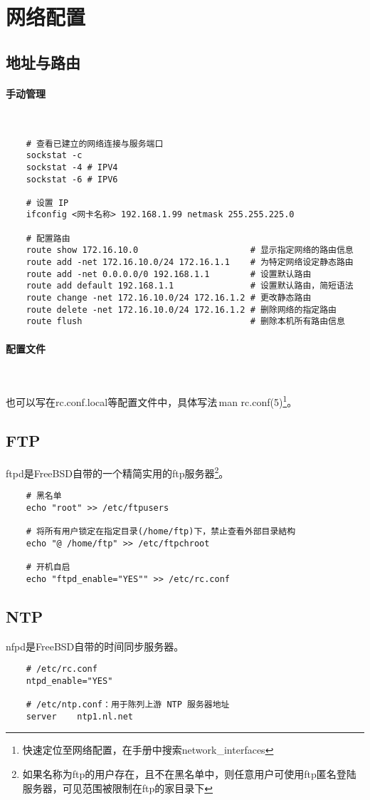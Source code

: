 \section{网络配置}

\subsection{地址与路由}

\paragraph{手动管理}~

\begin{lstlisting}
    # 查看已建立的网络连接与服务端口
    sockstat -c
    sockstat -4 # IPV4
    sockstat -6 # IPV6

    # 设置 IP
    ifconfig <网卡名称> 192.168.1.99 netmask 255.255.225.0

    # 配置路由
	route show 172.16.10.0                      # 显示指定网络的路由信息
	route add -net 172.16.10.0/24 172.16.1.1    # 为特定网络设定静态路由
	route add -net 0.0.0.0/0 192.168.1.1        # 设置默认路由
	route add default 192.168.1.1               # 设置默认路由，简短语法
	route change -net 172.16.10.0/24 172.16.1.2 # 更改静态路由
	route delete -net 172.16.10.0/24 172.16.1.2 # 删除网络的指定路由
	route flush                                 # 删除本机所有路由信息
\end{lstlisting}

\paragraph{配置文件}~

也可以写在rc.conf.local等配置文件中，具体写法\,man rc.conf(5)\footnote{快速定位至网络配置，在手册中搜索network\_interfaces}。

\subsection{FTP}
ftpd是FreeBSD自带的一个精简实用的ftp服务器\footnote{如果名称为ftp的用户存在，且不在黑名单中，则任意用户可使用ftp匿名登陆服务器，可见范围被限制在ftp的家目录下}。
\begin{lstlisting}
    # 黑名单
    echo "root" >> /etc/ftpusers

    # 将所有用户锁定在指定目录(/home/ftp)下，禁止查看外部目录結构
    echo "@ /home/ftp" >> /etc/ftpchroot

    # 开机自启
    echo "ftpd_enable="YES"" >> /etc/rc.conf
\end{lstlisting}

\subsection{NTP}
nfpd是FreeBSD自带的时间同步服务器。
\begin{lstlisting}
    # /etc/rc.conf
    ntpd_enable="YES"

    # /etc/ntp.conf：用于陈列上游 NTP 服务器地址
    server    ntp1.nl.net
\end{lstlisting}

